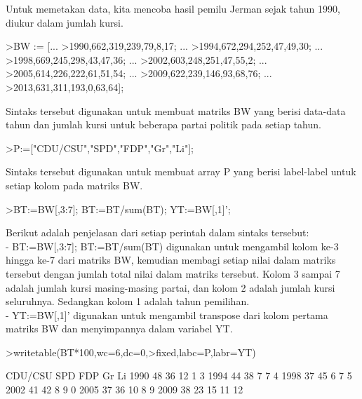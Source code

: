 \documentclass[a4paper,10pt]{article}
\begin{document}
\begin{eulernotebook}
\begin{eulercomment}
\begin{eulercomment}
\begin{eulercomment}
\begin{eulercomment}
\begin{eulercomment}
\begin{eulercomment}
\begin{eulercomment}
\begin{eulercomment}
\begin{eulercomment}
\begin{eulercomment}
\begin{eulercomment}
\begin{eulercomment}
\begin{eulercomment}
\begin{eulercomment}
\begin{eulercomment}
\begin{eulercomment}
\begin{eulercomment}
\begin{eulercomment}
\begin{eulercomment}
Untuk memetakan data, kita mencoba hasil pemilu Jerman sejak tahun
1990, diukur dalam jumlah kursi.
\end{eulercomment}
\begin{eulerprompt}
>BW := [...
>1990,662,319,239,79,8,17; ...
>1994,672,294,252,47,49,30; ...
>1998,669,245,298,43,47,36; ...
>2002,603,248,251,47,55,2; ...
>2005,614,226,222,61,51,54; ...
>2009,622,239,146,93,68,76; ...
>2013,631,311,193,0,63,64];
\end{eulerprompt}
\begin{eulercomment}
Sintaks tersebut digunakan untuk membuat matriks BW yang berisi
data-data tahun dan jumlah kursi untuk beberapa partai politik pada
setiap tahun.
\end{eulercomment}
\begin{eulerprompt}
>P:=["CDU/CSU","SPD","FDP","Gr","Li"];
\end{eulerprompt}
\begin{eulercomment}
Sintaks tersebut digunakan untuk membuat array P yang berisi
label-label untuk setiap kolom pada matriks BW.
\end{eulercomment}
\begin{eulerprompt}
>BT:=BW[,3:7]; BT:=BT/sum(BT); YT:=BW[,1]';
\end{eulerprompt}
\begin{eulercomment}
Berikut adalah penjelasan dari setiap perintah dalam sintaks tersebut:\\
- BT:=BW[,3:7]; BT:=BT/sum(BT) digunakan untuk mengambil kolom ke-3
hingga ke-7 dari matriks BW, kemudian membagi setiap nilai dalam
matriks tersebut dengan jumlah total nilai dalam matriks tersebut.
Kolom 3 sampai 7 adalah jumlah kursi masing-masing partai, dan kolom 2
adalah jumlah kursi seluruhnya. Sedangkan kolom 1 adalah tahun
pemilihan.\\
- YT:=BW[,1]' digunakan untuk mengambil transpose dari kolom pertama
matriks BW dan menyimpannya dalam variabel YT.
\end{eulercomment}
\begin{eulerprompt}
>writetable(BT*100,wc=6,dc=0,>fixed,labc=P,labr=YT)
\end{eulerprompt}
\begin{euleroutput}
         CDU/CSU   SPD   FDP    Gr    Li
    1990      48    36    12     1     3
    1994      44    38     7     7     4
    1998      37    45     6     7     5
    2002      41    42     8     9     0
    2005      37    36    10     8     9
    2009      38    23    15    11    12

\end{euleroutput}
\end{eulercomment}
\end{eulercomment}
\end{eulercomment}
\end{eulercomment}
\end{eulercomment}
\end{eulercomment}
\end{eulercomment}
\end{eulercomment}
\end{eulercomment}
\end{eulercomment}
\end{eulercomment}
\end{eulercomment}
\end{eulercomment}
\end{eulercomment}
\end{eulercomment}
\end{eulercomment}
\end{eulercomment}
\end{eulercomment}
\end{eulernotebook}
\end{document}
